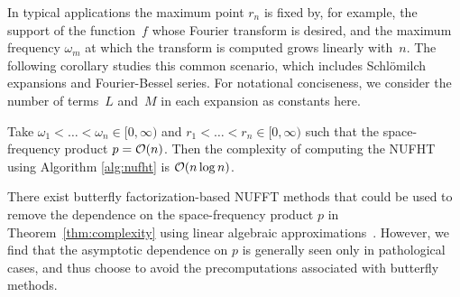 In typical applications the maximum point $r_n$ is fixed by, for example, the
support of the function~$f$ whose Fourier transform is desired, and the maximum
frequency $\omega_m$ at which the transform is computed grows linearly with~$n$.
The following corollary studies this common scenario, which includes
Schl\"omilch expansions and Fourier-Bessel series. For notational conciseness,
we consider the number of terms~$L$ and~$M$ in each expansion as constants here.
\begin{corollary}
  \label{cor:complexity} Take $\omega_1 < \dots < \omega_n \in [0,\infty)$ and
    $r_1 < \dots < r_n \in [0,\infty)$ such that the space-frequency product $p
    = \mathcal{O}(n)$. Then the complexity of computing the NUFHT using Algorithm
    \ref{alg:nufht} is $\mathcal{O}(n\log n)$.
\end{corollary}

\begin{remark}
  There exist butterfly factorization-based NUFFT methods that could be used to
  remove the dependence on the space-frequency product $p$ in
  Theorem~\ref{thm:complexity} using linear algebraic
  approximations~\cite{pang2020interpolative}. However, we find that the
  asymptotic dependence on $p$ is generally seen only in pathological cases, and
  thus choose to avoid the precomputations associated with butterfly methods.

\end{remark}



